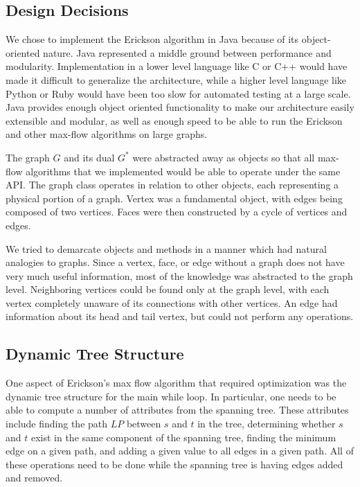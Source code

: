 \documentclass[12pt]{article}
\begin{document}
\subsection{Design Decisions}

We chose to implement the Erickson algorithm in Java because of its object-oriented nature. Java represented a middle ground between performance and modularity. Implementation in a lower level language like C or C++ would have made it difficult to generalize the architecture, while a higher level language like Python or Ruby would have been too slow for automated testing at a large scale. Java provides enough object oriented functionality to make our architecture easily extensible and modular, as well as enough speed to be able to run the Erickson and other max-flow algorithms on large graphs.

The graph $G$ and its dual $G^*$ were abstracted away as objects so that all max-flow algorithms that we implemented would be able to operate under the same API. The graph class operates in relation to other objects, each representing a physical portion of a graph. Vertex was a fundamental object, with edges being composed of two vertices. Faces were then constructed by a cycle of vertices and edges. 

We tried to demarcate objects and methods in a manner which had natural analogies to graphs. Since a vertex, face, or edge without a graph does not have very much useful information, most of the knowledge was abstracted to the graph level. Neighboring vertices could be found only at the graph level, with each vertex completely unaware of its connections with other vertices. An edge had information about its head and tail vertex, but could not perform any operations.

\subsection{Dynamic Tree Structure}

One aspect of Erickson's max flow algorithm that required optimization was the dynamic tree structure for the main while loop. In particular, one needs to be able to compute a number of attributes from the spanning tree. These attributes include finding the path $LP$ between $s$ and $t$ in the tree, determining whether $s$ and $t$ exist in the same component of the spanning tree, finding the minimum edge on a given path, and adding a given value to all edges in a given path. All of these operations need to be done while the spanning tree is having edges added and removed. 
\end{document}
